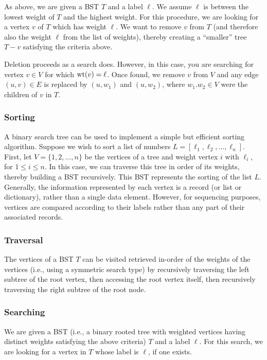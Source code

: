 As above, we are given a BST $T$ and a
label $\ell$. We assume $\ell$ is between the
lowest weight of $T$ and the highest weight.
For this procedure, we are looking for a vertex $v$ of
$T$ which has weight $\ell$. We want to remove $v$ from
$T$ (and therefore also the weight $\ell$ from the list of weights),
thereby creating a ``smaller'' tree $T- v$ satisfying
the criteria above.

Deletion proceeds as a search does. However, in this case, you are
searching for vertex $v\in V$ for which
${\rm wt}(v)=\ell$. Once found, we remove $v$ from $V$
and any edge $(u,v)\in E$ is replaced by $(u,w_1)$
and $(u,w_2)$, where $w_1.w_2\in V$ were the children of $v$
in $T$.

\subsubsection{Sorting}

A binary search tree can be used to implement a simple but efficient
sorting algorithm. Suppose we wish to sort a list of numbers
$L = [\ell_1, \ell_2,\dots, \ell_n]$. First, let $V=\{1,2,\dots,n\}$
be the vertices of a tree and weight vertex $i$ with $\ell_i$,
for $1\leq i\leq n$. In this case, we can traverse this tree
in order of its weights, thereby building a BST recursively.
This BST represents the sorting of the list $L$.
Generally, the information represented by each vertex is a
record (or list or dictionary), rather than a single data element. However,
for sequencing purposes, vertices are compared according to their
labels rather than any part of their associated records.

\subsubsection{Traversal}

The vertices of a BST $T$ can be visited retrieved in-order of the
weights of the vertices (i.e.,
using a symmetric search type) by recursively  traversing the left subtree of the
root vertex, then accessing the root vertex itself, then recursively traversing the
right subtree of the root node.

\subsubsection{Searching}

We are given a BST (i.e., a binary rooted tree with weighted vertices
having distinct weights satisfying the above criteria) $T$ and a
label $\ell$. For this search, we are looking for a vertex in $T$
whose label is $\ell$, if one exists.

